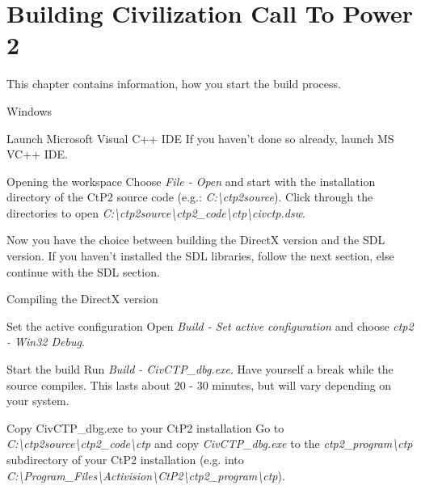 \chapter{Building Civilization Call To Power 2\label{cha:buildctp2}}
This chapter contains information, how you start the build process.
\begin{section}{Windows}
\begin{subsection}{Launch Microsoft Visual C++ IDE}
If you haven't done so already, launch MS VC++ IDE.
\end{subsection}%

\begin{subsection}{Opening the workspace}
Choose \textit{File - Open} and start with the installation directory of the CtP2 source code (e.g.: \textit{C:\textbackslash{}ctp2source}). Click through the directories to open \textit{C:\textbackslash{}ctp2source\textbackslash{}ctp2\_code\textbackslash{}ctp\textbackslash{}civctp.dsw}.

Now you have the choice between building the DirectX version and the SDL version. If you haven't installed the SDL libraries, follow the next section, else continue with the SDL section.
\end{subsection}%

\begin{subsection}{Compiling the DirectX version}
\begin{subsubsection}{Set the active configuration}
Open \textit{Build - Set active configuration} and choose \textit{ctp2 - Win32 Debug}.
\end{subsubsection}%

\begin{subsubsection}{Start the build}
Run \textit{Build - CivCTP\_dbg.exe}. Have yourself a break while the source compiles. This lasts about 20 - 30 minutes, but will vary depending on your system.
\end{subsubsection}%

\begin{subsubsection}{Copy CivCTP\_dbg.exe to your CtP2 installation}
Go to \textit{C:\textbackslash{}ctp2source\textbackslash{}ctp2\_code\textbackslash{}ctp} and copy \textit{CivCTP\_dbg.exe} to the \textit{ctp2\_program\textbackslash{}ctp} subdirectory of your CtP2 installation (e.g. into \textit{C:\textbackslash{}Program\_Files\textbackslash{}Activision\textbackslash{}CtP2\textbackslash{}ctp2\_program\textbackslash{}ctp}).
\end{subsubsection}%


\end{subsection}
\end{section}
